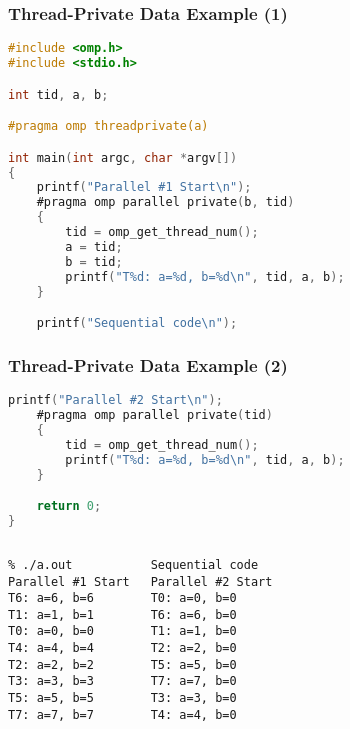 \begin{frame}[fragile]
  \frametitle{Thread-Private Data Example (1)}

  
  \begin{lstlisting}[language=C,morekeywords={foreach,pragma,omp,parallel,single,nowait,task,untied,barrier,taskyield}]
#include <omp.h>
#include <stdio.h>

int tid, a, b;

#pragma omp threadprivate(a)

int main(int argc, char *argv[])
{
    printf("Parallel #1 Start\n");
    #pragma omp parallel private(b, tid)
    {
        tid = omp_get_thread_num();
        a = tid;
        b = tid;
        printf("T%d: a=%d, b=%d\n", tid, a, b);
    }

    printf("Sequential code\n");
  \end{lstlisting}
  


\end{frame}

\begin{frame}[fragile]
  \frametitle{Thread-Private Data Example (2)}

  
  \begin{lstlisting}[language=C,morekeywords={foreach,pragma,omp,parallel,single,nowait,task,untied,barrier,taskyield}]
    printf("Parallel #2 Start\n");
    #pragma omp parallel private(tid)
    {
        tid = omp_get_thread_num();
        printf("T%d: a=%d, b=%d\n", tid, a, b);
    }

    return 0;
}    
  \end{lstlisting}
  
  
  \begin{center}
    \begin{columns}[c]
      \column{1.5in}
        \begin{lstlisting}
% ./a.out
Parallel #1 Start
T6: a=6, b=6
T1: a=1, b=1
T0: a=0, b=0
T4: a=4, b=4
T2: a=2, b=2
T3: a=3, b=3
T5: a=5, b=5
T7: a=7, b=7
        \end{lstlisting}
      \column{1.5in}
        \begin{lstlisting}
Sequential code
Parallel #2 Start
T0: a=0, b=0
T6: a=6, b=0
T1: a=1, b=0
T2: a=2, b=0
T5: a=5, b=0
T7: a=7, b=0
T3: a=3, b=0
T4: a=4, b=0
        \end{lstlisting}
    \end{columns}
  \end{center}
\end{frame}

